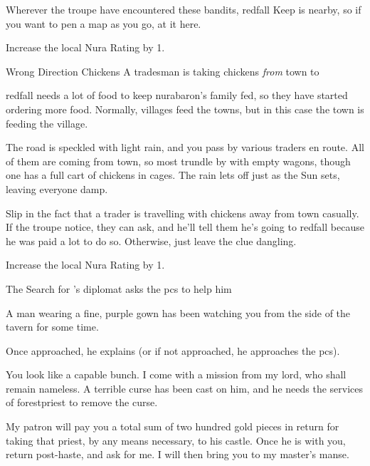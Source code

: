 Wherever the troupe have encountered these bandits, \gls{redfall} Keep is nearby, so if you want to pen a map as you go, at it here.

Increase the local Nura Rating by 1.

{\N Wrong Direction Chickens}%
{A tradesman is taking chickens \emph{from} town to }%

\Gls{redfall} needs a lot of food to keep \gls{nurabaron}'s family fed, so they have started ordering more food.
Normally, \glspl{village} feed the towns, but in this case the town is feeding the village.

\begin{boxtext}

  The road is speckled with light rain, and you pass by various traders en route.
  All of them are coming from town, so most trundle by with empty wagons, though one has a full cart of chickens in cages.
  The rain lets off just as the Sun sets, leaving everyone damp.

\end{boxtext}

Slip in the fact that a trader is travelling with chickens away from \gls{town} casually.
If the troupe notice, they can ask, and he'll tell them he's going to \gls{redfall} because he was paid a lot to do so.
Otherwise, just leave the clue dangling.

Increase the local Nura Rating by 1.

\resumecontents[Town]

{The Search for }%
{'s diplomat asks the \glspl{pc} to help him}%
\label{nonstarter}

\stopcontents[Town]

\begin{boxtext}

  A man wearing a fine, purple gown has been watching you from the side of the tavern for some time.

\end{boxtext}

Once approached, he explains (or if not approached, he approaches the \glspl{pc}).

\begin{speechtext}

  You look like a capable bunch.
  I come with a mission from my lord, who shall remain nameless.
  A terrible curse has been cast on him, and he needs the services of \gls{forestpriest} to remove the curse.

  My patron will pay you a total sum of two hundred gold pieces in return for taking that priest, by any means necessary, to his castle.
  Once he is with you, return post-haste, and ask for me.
  I will then bring you to my master's manse.

\end{speechtext}

